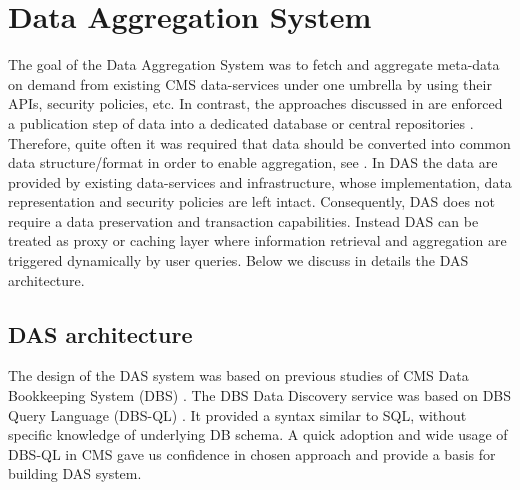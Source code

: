\documentclass[1p,times]{elsarticle}
\begin{document}
\section{Data Aggregation System\label{DAS}}
The goal of the Data Aggregation System was to fetch and aggregate meta-data 
on demand from existing CMS data-services under one umbrella by using their APIs, 
security policies, etc.
In contrast, the approaches
discussed in \cite{DBXplorer, QueryAnswer, FedDB} are
enforced a publication step of data into a dedicated database 
or central repositories \cite{iRODS}. Therefore, quite often it was required
that data should be converted into common data structure/format in order to enable
aggregation, see \cite{OpenArchive}. In DAS the data are provided
by existing data-services and infrastructure, whose implementation,
data representation and security policies are left intact. Consequently,
DAS does not require a data preservation and transaction capabilities. 
Instead DAS can be treated as proxy or caching layer where information 
retrieval and aggregation are triggered dynamically by user queries. 
Below we discuss in details the DAS architecture.

\subsection{DAS architecture}
The design of the DAS system was based on previous studies of CMS Data 
Bookkeeping System (DBS) \cite{DBS, DBS07}. The DBS Data Discovery service
\cite{DD} was based on DBS Query Language (DBS-QL) \cite{DBS-QL}. It provided
a syntax similar to SQL, without specific knowledge of underlying DB schema.
A quick adoption and wide usage of DBS-QL in CMS gave us confidence in chosen approach 
and provide a basis for building DAS system.
\end{document}
